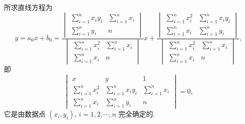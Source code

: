 \begin{solution}
所求直线方程为
\[
  y = a_{0}x + b_{0} = \frac{\begin{vmatrix} \sum\limits_{i=1}^{n}x_{i}y_{i} & \sum\limits_{i=1}^{n}x_{i} \\ \sum\limits_{i=1}^{n}y_{i} & n \end{vmatrix}}{\begin{vmatrix} \sum\limits_{i=1}^{n}x_{i}^{2} & \sum\limits_{i=1}^{n}x_{i} \\ \sum\limits_{i=1}^{n}x_{i} & n \end{vmatrix}} x + \frac{\begin{vmatrix} \sum\limits_{i=1}^{n}x_{i}^{2} & \sum\limits_{i=1}^{n}x_{i}y_{i} \\ \sum\limits_{i=1}^{n}x_{i} & \sum\limits_{i=1}^{n}y_{i} \end{vmatrix}}{\begin{vmatrix} \sum\limits_{i=1}^{n}x_{i}^{2} & \sum\limits_{i=1}^{n}x_{i} \\ \sum\limits_{i=1}^{n}x_{i} & n \end{vmatrix}},
\]
即
\[
  \begin{vmatrix}
    x & y & 1 \\
    \sum\limits_{i=1}^{n}x_{i}^{2} & \sum\limits_{i=1}^{n}x_{i}y_{i} & \sum\limits_{i=1}^{n}x_{i} \\
    \sum\limits_{i=1}^{n}x_{i} & \sum\limits_{i=1}^{n}y_{i} & n
  \end{vmatrix} = 0,
\]
它是由数据点 $(x_{i}, y_{i})$, $i = 1, 2, \cdots, n$ 完全确定的.
\end{solution}


